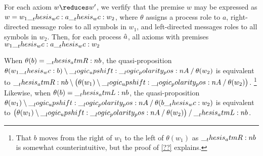 For each axiom $w \reduces w'$, we verfify that the premise $w$ may be expressed as $w = w_1 \wc a \wc w_2$, where $\theta$ assigns a process role to $a$, right-directed message roles to all symbols in $w_1$, and left-directed messages roles to all symbols in $w_2$.
Then, for each process $\hat{a}$, all axioms with premises $w_1 \wc a \wc w_2$
When $\theta(b) = \__thesis_atmR:n {b}$, the quasi-proposition $\theta(w_1 \wc b) \limp \up \p{A} \pmir \theta(w_2)$ is equivalent to $\__thesis_atmR:n {b} \mathbin { \setminus } \bigl(\theta(w_1) \mathbin { \setminus } \__logic_upshift: \__logic_polarity_pos:n {A} \mathbin { / } \theta(w_2)\bigr)$.%
\footnote{That $b$ moves from the right of $w_1$ to the left of $\theta(w_1)$ as $\__thesis_atmR:n {b}$ is somewhat counterintuitive, but the proof of \cref{??} explains.}
Likewise, when $\theta(b) = \__thesis_atmL:n {b}$, the quasi-proposition $\theta(w_1) \limp \up \p{A} \pmir \theta(b \wc w_2)$ is equivalent to $\bigl(\theta(w_1) \mathbin { \setminus } \__logic_upshift: \__logic_polarity_pos:n {A} \mathbin { / } \theta(w_2)\bigr) \mathbin { / } \__thesis_atmL:n {b}$.
 
